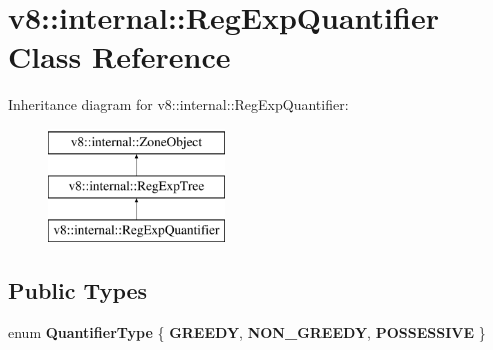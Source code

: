 \hypertarget{classv8_1_1internal_1_1RegExpQuantifier}{}\section{v8\+:\+:internal\+:\+:Reg\+Exp\+Quantifier Class Reference}
\label{classv8_1_1internal_1_1RegExpQuantifier}
Inheritance diagram for v8\+:\+:internal\+:\+:Reg\+Exp\+Quantifier\+:\begin{figure}[H]
\begin{center}
\leavevmode
\includegraphics[height=3.000000cm]{classv8_1_1internal_1_1RegExpQuantifier}
\end{center}
\end{figure}
\subsection*{Public Types}
\begin{DoxyCompactItemize}
\item 
\mbox{\label{classv8_1_1internal_1_1RegExpQuantifier_aa9c83c35aa00f3975ba0c62f7877142e}} 
enum {\bfseries Quantifier\+Type} \{ {\bfseries G\+R\+E\+E\+DY}, 
{\bfseries N\+O\+N\+\_\+\+G\+R\+E\+E\+DY}, 
{\bfseries P\+O\+S\+S\+E\+S\+S\+I\+VE}
 \}
\end{DoxyCompactItemize}
